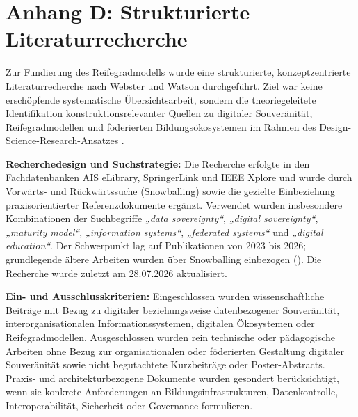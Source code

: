 \documentclass[10pt,a4paper]{article}
\begin{document}
\section*{Anhang D: Strukturierte Literaturrecherche}
\label{sec:anhang-d}

Zur Fundierung des Reifegradmodells wurde eine strukturierte, konzeptzentrierte Literaturrecherche nach Webster und Watson \cite{WW02} durchgeführt. Ziel war keine erschöpfende systematische Übersichtsarbeit, sondern die theoriegeleitete Identifikation konstruktionsrelevanter Quellen zu digitaler Souveränität, Reifegradmodellen und föderierten Bildungsökosystemen im Rahmen des Design-Science-Research-Ansatzes \cite{He04,Pe07}.

\textbf{Recherchedesign und Suchstrategie:} Die Recherche erfolgte in den Fachdatenbanken AIS eLibrary, SpringerLink und IEEE Xplore und wurde durch Vorwärts- und Rückwärtssuche (Snowballing) sowie die gezielte Einbeziehung praxisorientierter Referenzdokumente ergänzt. Verwendet wurden insbesondere Kombinationen der Suchbegriffe \textit{„data sovereignty“}, \textit{„digital sovereignty“}, \textit{„maturity model“}, \textit{„information systems“}, \textit{„federated systems“} und \textit{„digital education“}. Der Schwerpunkt lag auf Publikationen von 2023 bis 2026; grundlegende ältere Arbeiten wurden über Snowballing einbezogen (\cite{OJ19,PT20}). Die Recherche wurde zuletzt am 28.07.2026 aktualisiert.

\textbf{Ein- und Ausschlusskriterien:} Eingeschlossen wurden wissenschaftliche Beiträge mit Bezug zu digitaler beziehungsweise datenbezogener Souveränität, interorganisationalen Informationssystemen, digitalen Ökosystemen oder Reifegradmodellen. Ausgeschlossen wurden rein technische oder pädagogische Arbeiten ohne Bezug zur organisationalen oder föderierten Gestaltung digitaler Souveränität sowie nicht begutachtete Kurzbeiträge oder Poster-Abstracts. Praxis- und architekturbezogene Dokumente wurden gesondert berücksichtigt, wenn sie konkrete Anforderungen an Bildungsinfrastrukturen, Datenkontrolle, Interoperabilität, Sicherheit oder Governance formulieren.
\end{document}
